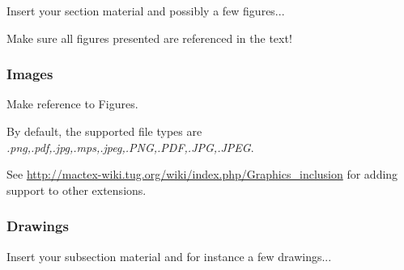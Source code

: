 Insert your section material and possibly a few figures...

Make sure all figures presented are referenced in the text!


\subsubsection{Images}
\label{subsection:images}

\iffalse
\begin{figure}[!htb]
  \centering
  \texttt{[image: Airbus\_A350.jpg]}
  \caption[Caption for figure in TOC.]{Caption for figure.}
  \label{fig:airbus1}
\end{figure}

\begin{figure}[!htb]
  \begin{subfigmatrix}{2}
    \subfigure[Airbus A320]{\texttt{[image: Airbus\_A320\_sharklets.png]}}
    \subfigure[Bombardier CRJ200]{\texttt{[image: Bombardier\_CRJ200.png]}}
  \end{subfigmatrix}
  \caption{Some aircrafts.}
  \label{fig:aircrafts}
\end{figure}
\fi

Make reference to Figures.

By default, the supported file types are {\it .png,.pdf,.jpg,.mps,.jpeg,.PNG,.PDF,.JPG,.JPEG}.

See \url{http://mactex-wiki.tug.org/wiki/index.php/Graphics_inclusion} for adding support to other extensions.


\subsubsection{Drawings}
\label{subsection:drawings}

Insert your subsection material and for instance a few drawings...

